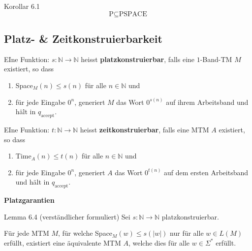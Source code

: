 \documentclass[a4paper, 11pt]{article}
\def\N{\mathbb{N}}
\newcommand\myTitle[1]{{\large \textbf {#1}}}
\begin{document}
                            
                            \begin{mainbox}{Korollar 6.1}
                                $$\text{P} \subseteq \text{PSPACE}$$
                            \end{mainbox}
                        \subsection{Platz- \& Zeitkonstruierbarkeit}
                            \begin{mainbox}{}
                                EIne Funktion: $s: \N \to \N$ heisst \textbf{platzkonstruierbar}, falls eine $1$-Band-TM $M$ existiert, so dass 
                                \begin{enumerate}[label=(\roman*)]
                                    \item Space$_M(n) \leq s(n)$ für alle $n \in \N$ und 
                                    \item für jede Eingabe $0^n$, generiert $M$ das Wort $0^{s(n)}$ auf ihrem Arbeitsband und hält in $q_{\text{accept}}$.
                                \end{enumerate}
                            \end{mainbox}

                            \begin{mainbox}{}
                                EIne Funktion: $t: \N \to \N$ heisst \textbf{zeitkonstruierbar}, falls eine MTM $A$ existiert, so dass 
                                \begin{enumerate}[label=(\roman*)]
                                    \item Time$_A(n) \leq t(n)$ für alle $n \in \N$ und 
                                    \item für jede Eingabe $0^n$, generiert $A$ das Wort $0^{t(n)}$ auf dem ersten Arbeitsband und hält in $q_{\text{accept}}$.
                                \end{enumerate}
                            \end{mainbox}

                            \myTitle{Platzgarantien}
                            \begin{mainbox}{Lemma 6.4 (verständlicher formuliert)}
                                Sei $s: \N \to \N$ platzkonstruierbar.
                        
                                Für jede MTM $M$, für welche Space$_M(w) \leq s(|w|)$ nur für alle $w \in L(M)$ erfüllt, 
                                existiert eine äquivalente MTM $A$, welche dies für alle $w \in \Sigma^*$ erfüllt.
                            \end{mainbox}
                            
\end{document}
